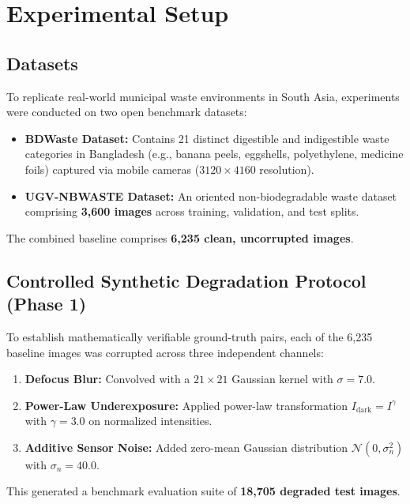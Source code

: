 \documentclass[conference]{IEEEtran}
\begin{document}
\section{Experimental Setup}

\subsection{Datasets}
To replicate real-world municipal waste environments in South Asia, experiments were conducted on two open benchmark datasets:
\begin{itemize}
    \item \textbf{BDWaste Dataset:} Contains 21 distinct digestible and indigestible waste categories in Bangladesh (e.g., banana peels, eggshells, polyethylene, medicine foils) captured via mobile cameras ($3120 \times 4160$ resolution).
    \item \textbf{UGV-NBWASTE Dataset:} An oriented non-biodegradable waste dataset comprising \textbf{3,600 images} across training, validation, and test splits.
\end{itemize}
The combined baseline comprises \textbf{6,235 clean, uncorrupted images}.

\subsection{Controlled Synthetic Degradation Protocol (Phase 1)}
To establish mathematically verifiable ground-truth pairs, each of the 6,235 baseline images was corrupted across three independent channels:
\begin{enumerate}
    \item \textbf{Defocus Blur:} Convolved with a $21 \times 21$ Gaussian kernel with $\sigma = 7.0$.
    \item \textbf{Power-Law Underexposure:} Applied power-law transformation $I_{\text{dark}} = I^\gamma$ with $\gamma = 3.0$ on normalized intensities.
    \item \textbf{Additive Sensor Noise:} Added zero-mean Gaussian distribution $\mathcal{N}(0, \sigma_n^2)$ with $\sigma_n = 40.0$.
\end{enumerate}
This generated a benchmark evaluation suite of \textbf{18,705 degraded test images}.

\end{document}
